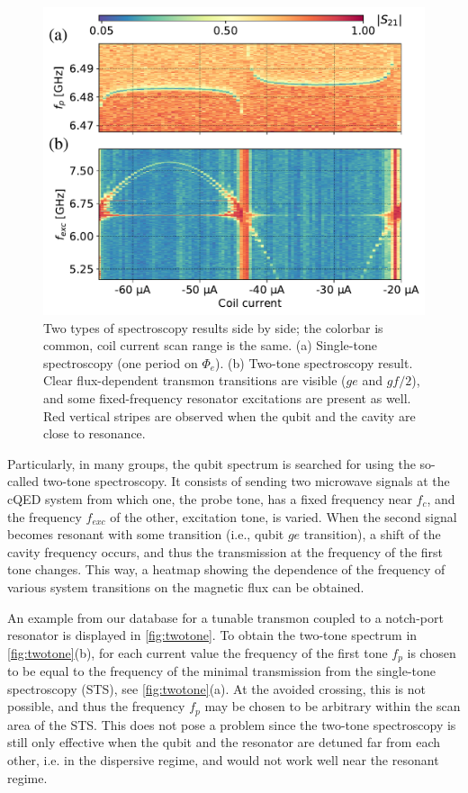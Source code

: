 \documentclass[%
 aip,
 amsmath,amssymb,
 reprint,%
]{revtex4-1}
\begin{document}
\begin{figure}[b]
	\centering
	\includegraphics[width=\linewidth]{twotone}
	\caption{Two types of spectroscopy results side by side; the colorbar is common, coil current scan range is the same. (a) Single-tone spectroscopy (one period on $\Phi_{e}$). (b) Two-tone spectroscopy result. Clear flux-dependent transmon transitions are visible ($ge$ and $gf/2$), and some fixed-frequency resonator excitations are present as well. Red vertical stripes are observed when the qubit and the cavity are close to resonance.}
	\label{fig:twotone}
\end{figure}


Particularly, in many groups, the qubit spectrum is searched for using the so-called two-tone spectroscopy\cite{wallraff2007}. It consists of sending two microwave signals at the cQED system from which one, the probe tone, has a fixed frequency near $f_c$, and the frequency $f_{exc}$ of the other, excitation tone,  is varied. When the second signal becomes resonant with some transition (i.e., qubit $ge$ transition), a shift of the cavity frequency occurs, and thus the transmission at the frequency of the first tone changes. This way, a heatmap showing the dependence of the frequency of various system transitions on the magnetic flux can be obtained. 

An example from our database for a tunable transmon coupled to a notch-port resonator is displayed in \autoref{fig:twotone}. To obtain the two-tone spectrum in \autoref{fig:twotone}(b), for each current value the frequency of the first tone $f_p$ is chosen to be equal to the frequency of the minimal transmission from the single-tone spectroscopy (STS), see \autoref{fig:twotone}(a). At the avoided crossing, this is not possible, and thus the frequency $f_p$ may be chosen to be arbitrary within the scan area of the STS. This does not pose a problem since the two-tone spectroscopy is still only effective when the qubit and the resonator are detuned far from each other, i.e. in the dispersive regime\cite{blais2004}, and would not work well near the resonant regime.
\end{document}
